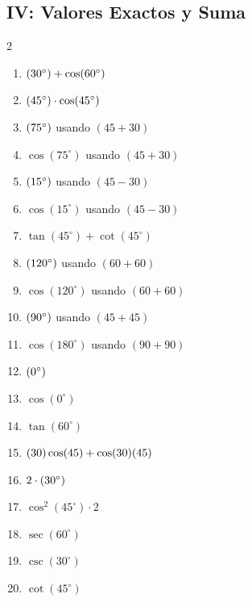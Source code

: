 \documentclass[letterpaper, 12pt]{article}
\let\sin\relax
\DeclareMathOperator{\sin}{sen}
\begin{document}
\subsection*{IV: Valores Exactos y Suma}
\begin{multicols}{2}
\begin{enumerate}[label=\textbf{\arabic*.}, start=51]
    \item $\sin(30^\circ) + \cos(60^\circ)$
    \item $\sin(45^\circ) \cdot \cos(45^\circ)$
    \item $\sin(75^\circ)$ usando $(45+30)$
    \item $\cos(75^\circ)$ usando $(45+30)$
    \item $\sin(15^\circ)$ usando $(45-30)$
    \item $\cos(15^\circ)$ usando $(45-30)$
    \item $\tan(45^\circ) + \cot(45^\circ)$
    \item $\sin(120^\circ)$ usando $(60+60)$
    \item $\cos(120^\circ)$ usando $(60+60)$
    \item $\sin(90^\circ)$ usando $(45+45)$
    \item $\cos(180^\circ)$ usando $(90+90)$
    \item $\sin(0^\circ)$ 
    \item $\cos(0^\circ)$ 
    \item $\tan(60^\circ)$
    \item $\sin(30)\cos(45) + \cos(30)\sin(45)$
    \item $2 \cdot \sin(30^\circ)$
    \item $\cos^2(45^\circ) \cdot 2$
    \item $\sec(60^\circ)$
    \item $\csc(30^\circ)$
    \item $\cot(45^\circ)$
\end{enumerate}
\end{multicols}

\newpage
\end{document}
